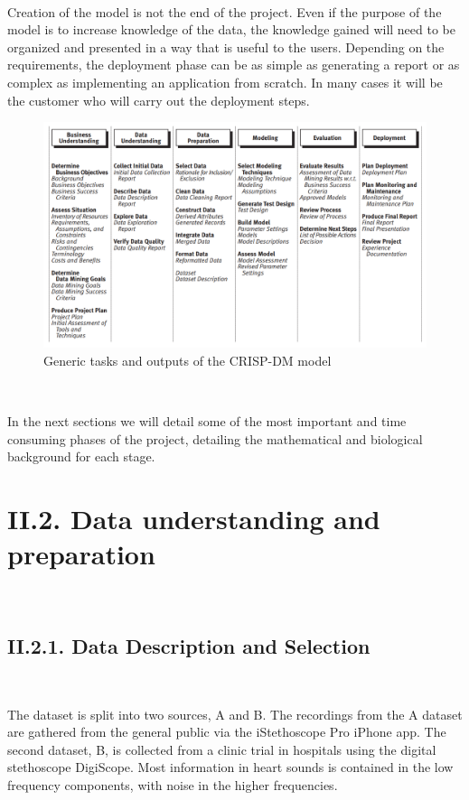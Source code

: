 \documentclass[11pt, a4papper]{report}
\theoremstyle{plain}
\theoremstyle{definition}
\theoremstyle{definition}
\theoremstyle{proposition}
\begin{document}
\

Creation of the model is not the end of the project. Even if the purpose of the model is to increase knowledge of the data, the knowledge gained will need to be organized and presented in a way that is useful to the users. Depending on the requirements, the deployment phase can be as simple as generating a report or as complex as implementing an application from scratch. In many cases it will be the customer who will carry out the deployment steps. 



\begin{figure}[h]
\includegraphics[width=16.2cm]{crispt.png}
\centering
\caption{Generic tasks and outputs of the CRISP-DM model}
\end{figure}
\

In the next sections we will detail some of the most important and time consuming phases of the project, detailing the mathematical and biological background for each stage.
\
\newpage

\section*{II.2. Data understanding and preparation}
\

\subsection*{II.2.1. Data Description and Selection}

\

The dataset is split into two sources, A and B. The recordings from the A dataset are gathered from the general public via the iStethoscope Pro iPhone app. The second dataset, B, is collected from a clinic trial in hospitals using the digital stethoscope DigiScope. Most information in heart sounds is contained in the low frequency components, with noise in the higher frequencies. \cite{2}
\\
\end{document}
